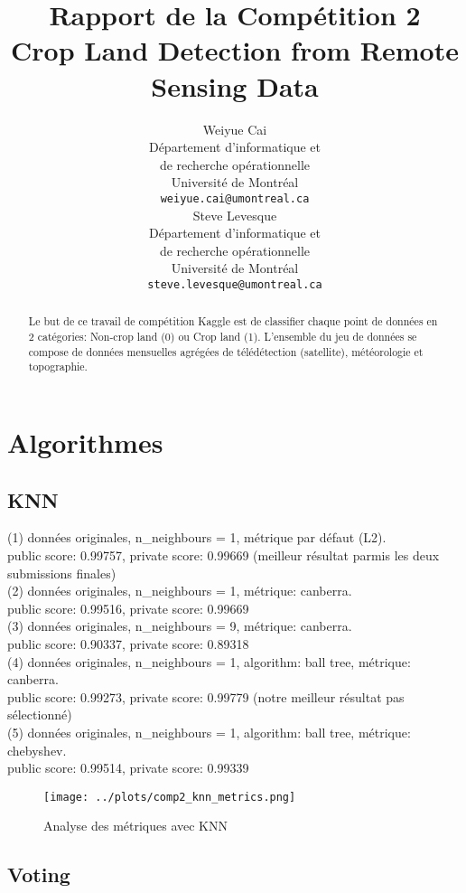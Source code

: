 \documentclass{article}
\title{
  Rapport de la Compétition 2 \\ 
  Crop Land Detection from Remote Sensing Data
}
\author{%
  Weiyue Cai \\
  Département d'informatique et \\
  de recherche opérationnelle\\
  Université de Montréal \\
  \texttt{weiyue.cai@umontreal.ca} \\
  \And
  Steve Levesque \\
  Département d'informatique et \\
  de recherche opérationnelle\\
  Université de Montréal \\
  \texttt{steve.levesque@umontreal.ca} \\
}
\begin{document}
\maketitle

\begin{abstract}
Le but de ce travail de compétition Kaggle est de classifier chaque point de 
données en 2 catégories: Non-crop land (0) ou Crop land (1). L'ensemble du jeu 
de données se compose de données mensuelles agrégées de télédétection 
(satellite), météorologie et topographie.\\
\end{abstract}

\section{Algorithmes}
\subsection{KNN}
(1) données originales, n\_neighbours = 1, métrique par défaut (L2). \\
public score: 0.99757, private score: 0.99669 (meilleur résultat parmis les deux 
submissions finales) \\
(2) données originales, n\_neighbours = 1, métrique: canberra. \\
public score: 0.99516, private score: 0.99669 \\
(3) données originales, n\_neighbours = 9, métrique: canberra. \\
public score: 0.90337, private score: 0.89318 \\
(4) données originales, n\_neighbours = 1, algorithm: ball tree,  métrique: 
canberra. \\
public score: 0.99273, private score: 0.99779 (notre meilleur résultat pas 
sélectionné) \\
(5) données originales, n\_neighbours = 1, algorithm: ball tree, métrique: 
chebyshev. \\
public score: 0.99514, private score: 0.99339 \\

\begin{figure}[!htbp]
  \centering
  \texttt{[image: ../plots/comp2\_knn\_metrics.png]}
  \caption{Analyse des métriques avec KNN}
\end{figure}

\subsection{Voting}
\end{document}
